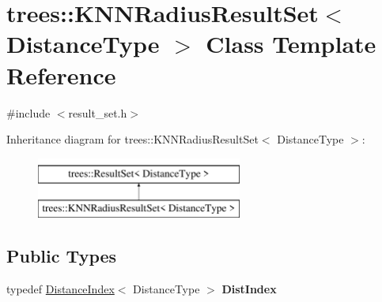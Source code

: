 \hypertarget{classtrees_1_1_k_n_n_radius_result_set}{}\section{trees\+:\+:K\+N\+N\+Radius\+Result\+Set$<$ Distance\+Type $>$ Class Template Reference}
\label{classtrees_1_1_k_n_n_radius_result_set}


{\ttfamily \#include $<$result\+\_\+set.\+h$>$}

Inheritance diagram for trees\+:\+:K\+N\+N\+Radius\+Result\+Set$<$ Distance\+Type $>$\+:\begin{figure}[H]
\begin{center}
\leavevmode
\includegraphics[height=2.000000cm]{classtrees_1_1_k_n_n_radius_result_set}
\end{center}
\end{figure}
\subsection*{Public Types}
\begin{DoxyCompactItemize}
\item 
\mbox{\label{classtrees_1_1_k_n_n_radius_result_set_a3fc3b4b132a028361b00884df77f7d7e}} 
typedef \hyperlink{structtrees_1_1_distance_index}{Distance\+Index}$<$ Distance\+Type $>$ {\bfseries Dist\+Index}
\end{DoxyCompactItemize}
